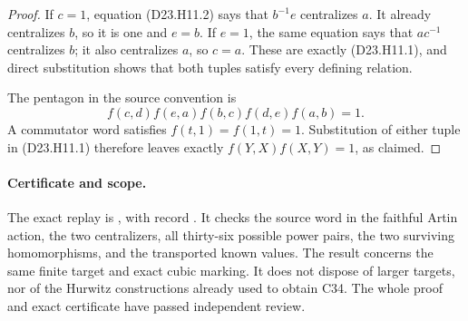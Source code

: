 \begin{proof}
If $c=1$, equation (D23.H11.2) says that $b^{-1}e$
centralizes $a$. It already centralizes $b$, so it is one
and $e=b$. If $e=1$, the same equation says that
$ac^{-1}$ centralizes $b$; it also centralizes $a$, so
$c=a$. These are exactly (D23.H11.1), and direct substitution
shows that both tuples satisfy every defining relation.

The pentagon in the source convention is
\[
          f(c,d)f(e,a)f(b,c)f(d,e)f(a,b)=1.
\]
A commutator word satisfies $f(t,1)=f(1,t)=1$.
Substitution of either tuple in (D23.H11.1) therefore leaves
exactly $f(Y,X)f(X,Y)=1$, as claimed.
\end{proof}

\paragraph{Certificate and scope.}
The exact replay is
, with record
.
It checks the source word in the faithful Artin action,
the two centralizers, all thirty-six possible power pairs,
the two surviving homomorphisms, and the transported
known values. The result concerns the same finite target
and exact cubic marking. It does not dispose of larger
targets, nor of the Hurwitz constructions already used
to obtain C34. The whole proof and exact certificate have passed independent review.
